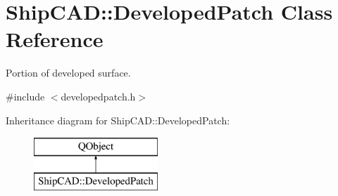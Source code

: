 \hypertarget{classShipCAD_1_1DevelopedPatch}{}\section{Ship\+C\+AD\+:\+:Developed\+Patch Class Reference}
\label{classShipCAD_1_1DevelopedPatch}


Portion of developed surface.  




{\ttfamily \#include $<$developedpatch.\+h$>$}

Inheritance diagram for Ship\+C\+AD\+:\+:Developed\+Patch\+:\begin{figure}[H]
\begin{center}
\leavevmode
\includegraphics[height=2.000000cm]{classShipCAD_1_1DevelopedPatch}
\end{center}
\end{figure}
